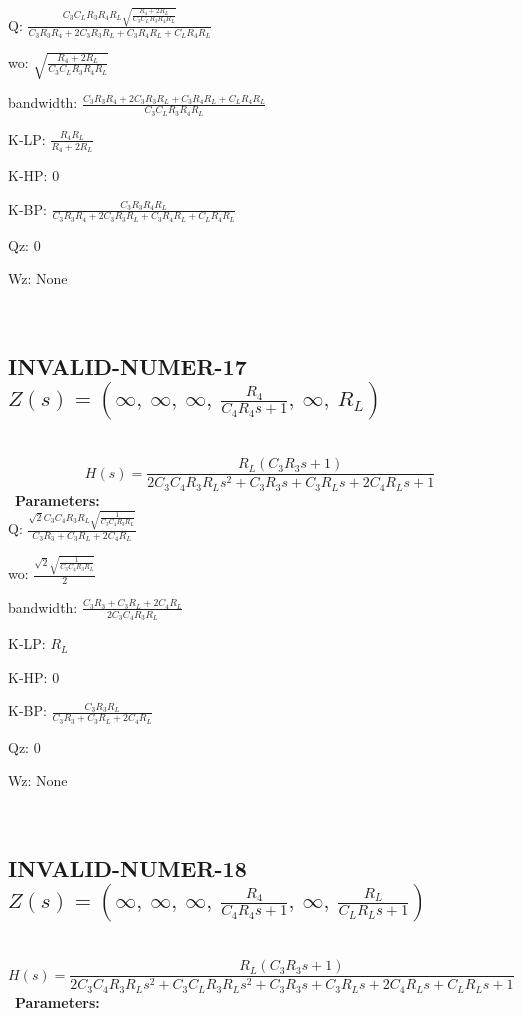 \documentclass{article}
\begin{document}
Q: $\frac{C_{3} C_{L} R_{3} R_{4} R_{L} \sqrt{\frac{R_{4} + 2 R_{L}}{C_{3} C_{L} R_{3} R_{4} R_{L}}}}{C_{3} R_{3} R_{4} + 2 C_{3} R_{3} R_{L} + C_{3} R_{4} R_{L} + C_{L} R_{4} R_{L}}$\ 

wo: $\sqrt{\frac{R_{4} + 2 R_{L}}{C_{3} C_{L} R_{3} R_{4} R_{L}}}$\ 

bandwidth: $\frac{C_{3} R_{3} R_{4} + 2 C_{3} R_{3} R_{L} + C_{3} R_{4} R_{L} + C_{L} R_{4} R_{L}}{C_{3} C_{L} R_{3} R_{4} R_{L}}$\ 

K-LP: $\frac{R_{4} R_{L}}{R_{4} + 2 R_{L}}$\ 

K-HP: $0$\ 

K-BP: $\frac{C_{3} R_{3} R_{4} R_{L}}{C_{3} R_{3} R_{4} + 2 C_{3} R_{3} R_{L} + C_{3} R_{4} R_{L} + C_{L} R_{4} R_{L}}$\ 

Qz: $0$\ 

Wz: $\text{None}$\ 

\ 

\subsection{INVALID-NUMER-17 $Z(s) = \left( \infty, \  \infty, \  \infty, \  \frac{R_{4}}{C_{4} R_{4} s + 1}, \  \infty, \  R_{L}\right)$ } \ 
\textbf{\[H(s) = \frac{R_{L} \left(C_{3} R_{3} s + 1\right)}{2 C_{3} C_{4} R_{3} R_{L} s^{2} + C_{3} R_{3} s + C_{3} R_{L} s + 2 C_{4} R_{L} s + 1}\] } \ 
\textbf{Parameters:}\\ 

Q: $\frac{\sqrt{2} C_{3} C_{4} R_{3} R_{L} \sqrt{\frac{1}{C_{3} C_{4} R_{3} R_{L}}}}{C_{3} R_{3} + C_{3} R_{L} + 2 C_{4} R_{L}}$\ 

wo: $\frac{\sqrt{2} \sqrt{\frac{1}{C_{3} C_{4} R_{3} R_{L}}}}{2}$\ 

bandwidth: $\frac{C_{3} R_{3} + C_{3} R_{L} + 2 C_{4} R_{L}}{2 C_{3} C_{4} R_{3} R_{L}}$\ 

K-LP: $R_{L}$\ 

K-HP: $0$\ 

K-BP: $\frac{C_{3} R_{3} R_{L}}{C_{3} R_{3} + C_{3} R_{L} + 2 C_{4} R_{L}}$\ 

Qz: $0$\ 

Wz: $\text{None}$\ 

\ 

\subsection{INVALID-NUMER-18 $Z(s) = \left( \infty, \  \infty, \  \infty, \  \frac{R_{4}}{C_{4} R_{4} s + 1}, \  \infty, \  \frac{R_{L}}{C_{L} R_{L} s + 1}\right)$ } \ 
\textbf{\[H(s) = \frac{R_{L} \left(C_{3} R_{3} s + 1\right)}{2 C_{3} C_{4} R_{3} R_{L} s^{2} + C_{3} C_{L} R_{3} R_{L} s^{2} + C_{3} R_{3} s + C_{3} R_{L} s + 2 C_{4} R_{L} s + C_{L} R_{L} s + 1}\] } \ 
\textbf{Parameters:}\\ 
\end{document}

